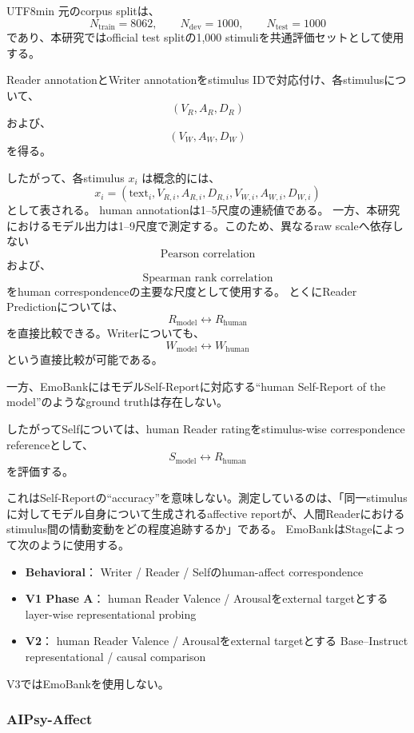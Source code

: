 \documentclass{article} %
\begin{document}
\begin{CJK*}{UTF8}{min}
元のcorpus splitは、
\[
N_{\mathrm{train}}=8062,
\qquad
N_{\mathrm{dev}}=1000,
\qquad
N_{\mathrm{test}}=1000
\]
であり、本研究ではofficial test splitの1,000 stimuliを共通評価セットとして使用する。

Reader annotationとWriter annotationをstimulus IDで対応付け、各stimulusについて、
\[
(V_R,A_R,D_R)
\]
および、
\[
(V_W,A_W,D_W)
\]
を得る。

したがって、各stimulus \(x_i\) は概念的には、
\[
x_i
=
(
\text{text}_i,
V_{R,i},A_{R,i},D_{R,i},
V_{W,i},A_{W,i},D_{W,i}
)
\]
として表される。
human annotationは1--5尺度の連続値である。
一方、本研究におけるモデル出力は1--9尺度で測定する。このため、異なるraw scaleへ依存しない
\[
\text{Pearson correlation}
\]
および、
\[
\text{Spearman rank correlation}
\]
をhuman correspondenceの主要な尺度として使用する。
とくにReader Predictionについては、
\[
R_{\mathrm{model}}
\leftrightarrow
R_{\mathrm{human}}
\]
を直接比較できる。Writerについても、
\[
W_{\mathrm{model}}
\leftrightarrow
W_{\mathrm{human}}
\]
という直接比較が可能である。

一方、EmoBankにはモデルSelf-Reportに対応する``human Self-Report of the model''のようなground truthは存在しない。

したがってSelfについては、human Reader ratingをstimulus-wise correspondence referenceとして、
\[
S_{\mathrm{model}}
\leftrightarrow
R_{\mathrm{human}}
\]
を評価する。

これはSelf-Reportの``accuracy''を意味しない。測定しているのは、「同一stimulusに対してモデル自身について生成されるaffective reportが、人間Readerにおけるstimulus間の情動変動をどの程度追跡するか」である。
EmoBankはStageによって次のように使用する。
\begin{itemize}
    \item \textbf{Behavioral}：
    Writer / Reader / Selfのhuman-affect correspondence

    \item \textbf{V1 Phase A}：
    human Reader Valence / Arousalをexternal targetとする
    layer-wise representational probing

    \item \textbf{V2}：
    human Reader Valence / Arousalをexternal targetとする
    Base--Instruct representational / causal comparison
\end{itemize}
V3ではEmoBankを使用しない。


\subsubsection{AIPsy-Affect}


\end{CJK*}
\end{document}
